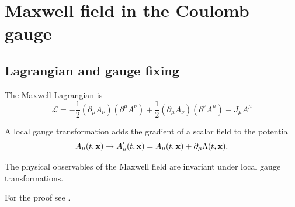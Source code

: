 \section{Maxwell field in the Coulomb gauge}

\subsection{Lagrangian and gauge fixing}

\begin{definition}
	The Maxwell Lagrangian is~\cite[p.~339]{Srednicki2007}
	\begin{equation}
		\mathcal{L}
		=
		-
		\frac{1}{2}
		(\partial_\mu A_\nu)
		(\partial^\mu A^\nu)
		+
		\frac{1}{2}
		(\partial_\mu A_\nu)
		(\partial^\nu A^\mu)
		-
		J_\mu A^\mu
		\label{eq:mw_lagrangian}
	\end{equation}
\end{definition}
\begin{definition}
	A local gauge transformation adds the gradient of a scalar field to the potential
	\begin{equation}
		A_\mu(t,\vb{x})
		\to
		A_\mu^\prime(t,\vb{x})
		=
		A_\mu(t,\vb{x})
		+
		\partial_\mu\Lambda(t,\vb{x})
		\label{eq:mw_local_gauge_transform}
		.
	\end{equation}	
\end{definition}
\begin{theorem}\label{thm:mw_local_gauge_invariance}
	The physical observables of the Maxwell field are invariant under local gauge transformations.
\end{theorem}
For the proof see .

